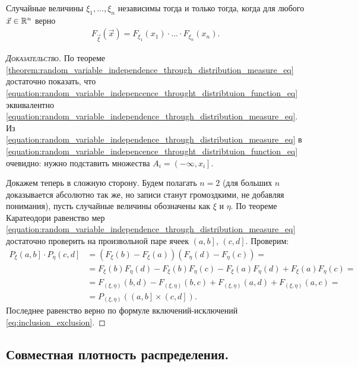 \documentclass[../main.tex]{subfiles}
\begin{document}
\begin{crly}
 \label{corollary:inpendence_joint_F}
 Случайные величины $ \xi_1, \ldots, \xi_n $ независимы тогда и только тогда, когда для любого $ \vec x \in \mathbb{R}^{n} $ верно
 \begin{align}
  \label{equation:random_variable_indepencence_throught_distribtuion_function_eq}
  F_{\vec\xi}(\vec x) = F_{\xi_1}(x_1) \cdot\ldots\cdot F_{\xi_n}(x_n).
 \end{align} 
\end{crly}
\begin{proof}[\normalfont\textsc{Доказательство}]
 По теореме \ref{theorem:random_variable_independence_through_distribution_measure_eq} достаточно показать, что \eqref{equation:random_variable_indepencence_throught_distribtuion_function_eq} эквивалентно \eqref{equation:random_variable_independence_through_distribution_measure_eq}. Из \eqref{equation:random_variable_independence_through_distribution_measure_eq} в \eqref{equation:random_variable_indepencence_throught_distribtuion_function_eq} очевидно: нужно подставить множества $ A_i = \left(-\infty, x_i\right]   $.

 Докажем теперь в сложную сторону. Будем полагать $ n = 2 $ (для больших $ n $ доказывается абсолютно так же, но записи станут громоздкими, не добавляя понимания), пусть случайные величины обозначены как $ \xi $ и $ \eta $. По теореме Каратеодори равенство мер \eqref{equation:random_variable_independence_through_distribution_measure_eq} достаточно проверить на произвольной паре ячеек $ \left(a, b\right]   $, $ \left(c, d\right] $. Проверим:
 \begin{align*}
  P_\xi \left(a, b\right] \cdot P_\eta \left(c, d\right] &= \left( F_\xi(b) - F_\xi(a) \right) \left( F_\eta(d) - F_\eta(c)  \right) = \\
  &= F_\xi(b)F_\eta(d) - F_\xi(b) F_\eta(c) - F_\xi(a) F_\eta(d) + F_\xi(a) F_\eta(c) = \\
  &= F_{(\xi,\eta)}(b, d) - F_{(\xi,\eta)}(b,c) + F_{(\xi,\eta)}(a,d) + F_{(\xi,\eta)}(a,c) = \\
  &= P_{(\xi,\eta)} \left( \left(a, b\right] \times \left(c, d\right]    \right).
 \end{align*} Последнее равенство верно по формуле включений-исключений \eqref{eq:inclusion_exclusion}.
\end{proof}

\subsection{Совместная плотность распределения.}
\end{document}
